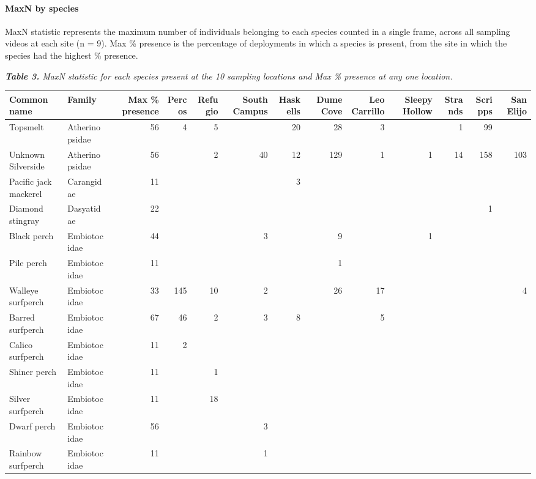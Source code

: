 \documentclass[]{article}
\let\oldparagraph\paragraph
\renewcommand{\paragraph}[1]{\oldparagraph{#1}\mbox{}}
\begin{document}
\paragraph{MaxN by species}\label{maxn-by-species}

MaxN statistic represents the maximum number of individuals belonging to
each species counted in a single frame, across all sampling videos at
each site (n = 9). Max \% presence is the percentage of deployments in
which a species is present, from the site in which the species had the
highest \% presence.

\emph{\textbf{Table 3.} MaxN statistic for each species present at the
10 sampling locations and Max \% presence at any one location. }

\begin{table}[H]
\centering
\begin{tabular}{l|l|r|r|r|r|r|r|r|r|r|r|r}
\hline
Common name & Family & Max \% presence & Percos & Refugio & South Campus & Haskells & Dume Cove & Leo Carrillo & Sleepy Hollow & Strands & Scripps & San Elijo\\
\hline
Topsmelt & Atherinopsidae & 56 & 4 & 5 &  & 20 & 28 & 3 &  & 1 & 99 & \\
\hline
Unknown Silverside & Atherinopsidae & 56 &  & 2 & 40 & 12 & 129 & 1 & 1 & 14 & 158 & 103\\
\hline
Pacific jack mackerel & Carangidae & 11 &  &  &  & 3 &  &  &  &  &  & \\
\hline
Diamond stingray & Dasyatidae & 22 &  &  &  &  &  &  &  &  & 1 & \\
\hline
Black perch & Embiotocidae & 44 &  &  & 3 &  & 9 &  & 1 &  &  & \\
\hline
Pile perch & Embiotocidae & 11 &  &  &  &  & 1 &  &  &  &  & \\
\hline
Walleye surfperch & Embiotocidae & 33 & 145 & 10 & 2 &  & 26 & 17 &  &  &  & 4\\
\hline
Barred surfperch & Embiotocidae & 67 & 46 & 2 & 3 & 8 &  & 5 &  &  &  & \\
\hline
Calico surfperch & Embiotocidae & 11 & 2 &  &  &  &  &  &  &  &  & \\
\hline
Shiner perch & Embiotocidae & 11 &  & 1 &  &  &  &  &  &  &  & \\
\hline
Silver surfperch & Embiotocidae & 11 &  & 18 &  &  &  &  &  &  &  & \\
\hline
Dwarf perch & Embiotocidae & 56 &  &  & 3 &  &  &  &  &  &  & \\
\hline
Rainbow surfperch & Embiotocidae & 11 &  &  & 1 &  &  &  &  &  &  & \\

\end{tabular}
\end{table}
\end{document}
